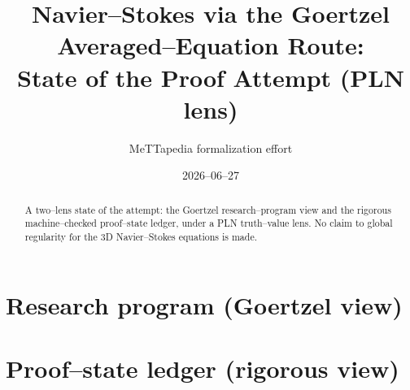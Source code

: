 \documentclass[11pt]{report}
\title{Navier--Stokes via the Goertzel Averaged--Equation Route:\\ State of the Proof Attempt (PLN lens)}
\author{MeTTapedia formalization effort}
\date{2026--06--27}
\begin{document}
\maketitle
\begin{abstract}
A two--lens state of the attempt: the Goertzel research--program view and the rigorous
machine--checked proof--state ledger, under a PLN truth--value lens. No claim to global
regularity for the 3D Navier--Stokes equations is made.
\end{abstract}
\chapter{Research program (Goertzel view)}

\chapter{Proof--state ledger (rigorous view)}

\end{document}

